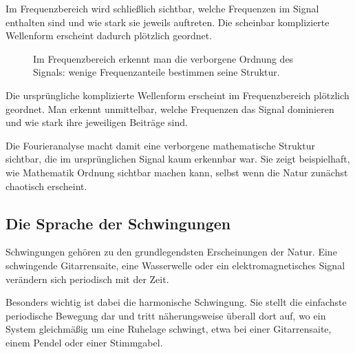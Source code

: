 Im Frequenzbereich wird schließlich sichtbar,
welche Frequenzen im Signal enthalten sind
und wie stark sie jeweils auftreten.
Die scheinbar komplizierte Wellenform erscheint dadurch plötzlich geordnet.

\FloatBarrier
\begin{figure}[h]
	\centering
	\caption{Im Frequenzbereich erkennt man die verborgene Ordnung des Signals: wenige Frequenzanteile bestimmen seine Struktur.}
	\label{fig:frequenzspektrum}
\end{figure}

Die ursprüngliche komplizierte Wellenform erscheint im Frequenzbereich
plötzlich geordnet.
Man erkennt unmittelbar,
welche Frequenzen das Signal dominieren
und wie stark ihre jeweiligen Beiträge sind.

Die Fourieranalyse macht damit eine verborgene mathematische Struktur sichtbar,
die im ursprünglichen Signal kaum erkennbar war.
Sie zeigt beispielhaft,
wie Mathematik Ordnung sichtbar machen kann,
selbst wenn die Natur zunächst chaotisch erscheint.

\subsection{Die Sprache der Schwingungen}

Schwingungen gehören zu den grundlegendsten Erscheinungen der Natur.
Eine schwingende Gitarrensaite,
eine Wasserwelle
oder ein elektromagnetisches Signal
verändern sich periodisch mit der Zeit.

Besonders wichtig ist dabei die harmonische Schwingung.
Sie stellt die einfachste periodische Bewegung dar
und tritt näherungsweise überall dort auf,
wo ein System gleichmäßig um eine Ruhelage schwingt,
etwa bei einer Gitarrensaite,
einem Pendel
oder einer Stimmgabel.

